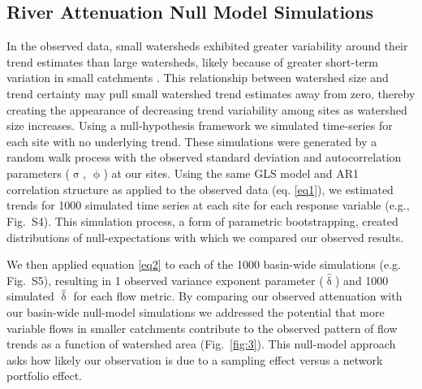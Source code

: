 \documentclass[9pt,twocolumn,twoside,lineno]{pnas-new}
\begin{document}
{\subsection*{River Attenuation Null Model Simulations} In the observed data, small watersheds exhibited greater variability around their trend estimates than large watersheds, likely because of greater short-term variation in small catchments \cite{Moore:2015}. This relationship between watershed size and trend certainty may pull small watershed trend estimates away from zero, thereby creating the appearance of decreasing trend variability among sites as watershed size increases. Using a null-hypothesis framework we simulated time-series for each site with no underlying trend. These simulations were generated by a random walk process with the observed standard deviation and autocorrelation parameters ($\hat{\upsigma}$, $\hat{\upphi}$) at our sites. Using the same GLS model and AR1 correlation structure as applied to the observed data (eq. \ref{eq1}), we estimated trends for 1000 simulated time series at each site for each response variable (e.g., Fig.~S4). This simulation process, a form of parametric bootstrapping, created distributions of null-expectations with which we compared our observed results.

We then applied equation \ref{eq2} to each of the 1000 basin-wide simulations (e.g. Fig.~S5), resulting in 1 observed variance exponent parameter ($\hat{\updelta}$) and 1000 simulated $\hat{\updelta}$ for each flow metric. By comparing our observed attenuation with our basin-wide null-model simulations we addressed the potential that more variable flows in smaller catchments contribute to the observed pattern of flow trends as a function of watershed area (Fig.~\ref{fig:3}). This null-model approach asks how likely our observation is due to a sampling effect versus a network portfolio effect.

}
\end{document}
